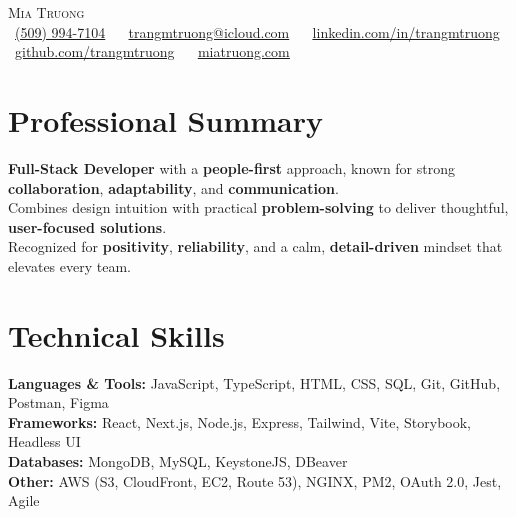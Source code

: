 \documentclass[letterpaper,11pt]{article}
\begin{document}
\begin{center}
    {\Large \scshape Mia Truong} \\[-1pt]
    \footnotesize
    \faPhone~\underline{(509) 994-7104} ~
    \faEnvelope~\underline{trangmtruong@icloud.com} ~
    \faLinkedin~\href{https://www.linkedin.com/in/trangmtruong}{\underline{linkedin.com/in/trangmtruong}} ~
    \faGithub~\href{https://github.com/trangmtruong}{\underline{github.com/trangmtruong}} ~
    \faBriefcase~\href{https://www.miatruong.com/}{\underline{miatruong.com}}
\end{center}
\vspace{-6pt}


\section{Professional Summary}
    \vspace{2pt}
\small
\noindent \textbf{Full-Stack Developer} with a \textbf{people-first} approach, known for strong \textbf{collaboration}, \textbf{adaptability}, and \textbf{communication}.\\
    \vspace{2pt}
\noindent Combines design intuition with practical \textbf{problem-solving} to deliver thoughtful, \textbf{user-focused solutions}.\\
\noindent Recognized for \textbf{positivity}, \textbf{reliability}, and a calm, \textbf{detail-driven} mindset that elevates every team.
\normalsize

 \vspace{-2pt}
\section{Technical Skills}
    \vspace{-2pt}
\small
\textbf{Languages \& Tools:} JavaScript, TypeScript, HTML, CSS, SQL, Git, GitHub, Postman, Figma \\
    \vspace{2pt}
\textbf{Frameworks:} React, Next.js, Node.js, Express, Tailwind, Vite, Storybook, Headless UI \\
    \vspace{2pt}
\textbf{Databases:} MongoDB, MySQL, KeystoneJS, DBeaver \\
    \vspace{2pt}
\textbf{Other:} AWS (S3, CloudFront, EC2, Route 53), NGINX, PM2, OAuth 2.0, Jest, Agile
\normalsize
\end{document}
